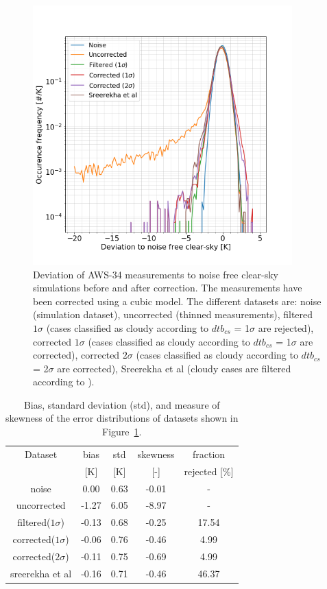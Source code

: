 \documentclass[12pt]{article}
\begin{document}
%
\begin{figure}[!tb]
  \centering \includegraphics[height=100mm]{PDF_corrected_AWS-34_AWS-42_thinned}
	\caption{Deviation of AWS-34 measurements to noise free clear-sky
      simulations before and after correction. The measurements have been
      corrected using a cubic model. The different datasets are: noise
      (simulation dataset), uncorrected (thinned measurements), filtered $1\sigma$ (cases classified as cloudy according to $dtb_{cs}$ = 1$\sigma$ are rejected), corrected $1\sigma$ (cases classified as cloudy according to $dtb_{cs}$ = 1$\sigma$ are corrected), corrected
      $2\sigma$ (cases classified as cloudy according to $dtb_{cs}$ = 2$\sigma$ are corrected), Sreerekha et al (cloudy cases are filtered according to \citet{rekha2012potential}).}
	\label{fig:correction:c34-42:thinned}
\end{figure}
%
\begin{table}[!p]
	\centering
	\begin{tabular}[b]{c|c|c|c|c}
		Dataset  		  &   bias &   std &   skewness  & fraction  \\
		&   [K]  &   [K] & [-] & rejected [\%]\\
		\hline
	noise             		&   0.00 &  0.63 &              -0.01 &                - \\
	uncorrected     		&  -1.27 &  6.05 &              -8.97 &                - \\
	filtered($1\sigma$)  	&  -0.13 &  0.68 &              -0.25 &               17.54 \\
	corrected($1\sigma$) 	&  -0.06 &  0.76 &              -0.46 &                4.99 \\
	corrected($2\sigma$) 	&  -0.11 &  0.75 &              -0.69 &                4.99 \\
	sreerekha et al         &  -0.16 &  0.71 &              -0.46 &               46.37 \\			
		\hline
\end{tabular}
\caption{Bias, standard deviation (std), and measure of skewness of the error
  distributions of datasets shown in
  Figure~\ref{fig:correction:c34-42:thinned}.}
\label{tab:correction:stats:34:42:thinned}
\end{table}
\end{document}
